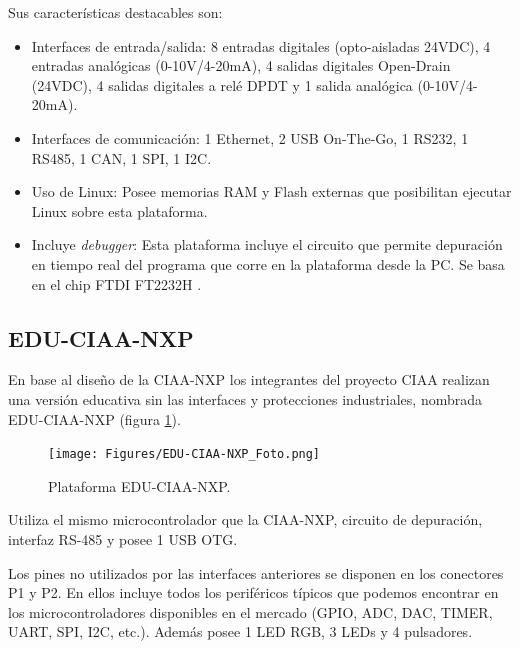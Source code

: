 Sus características destacables son:

\begin{itemize}
\item
Interfaces de entrada/salida: 8 entradas digitales (opto-aisladas 24VDC), 4 entradas analógicas (0-10V/4-20mA), 4 salidas digitales Open-Drain (24VDC), 4 salidas digitales a relé DPDT y 1 salida analógica (0-10V/4-20mA).
\item
Interfaces de comunicación: 1 Ethernet, 2 USB On-The-Go, 1 RS232, 1 RS485, 1 CAN, 1 SPI, 1 I2C.
\item
Uso de Linux: Posee memorias RAM y Flash externas que posibilitan ejecutar Linux sobre esta plataforma.
\item
Incluye \emph{debugger}: Esta plataforma incluye el circuito que permite depuración en tiempo real del programa que corre en la plataforma desde la PC. Se basa en el chip FTDI FT2232H \cite{FT2232H}.
\end{itemize}


\subsection{EDU-CIAA-NXP}

En base al diseño de la CIAA-NXP los integrantes del proyecto CIAA realizan una versión educativa sin las interfaces y protecciones industriales, nombrada EDU-CIAA-NXP (figura \ref{fig:eduCiaa}).

\begin{figure}[!htbp]
\begin{center}  %
\texttt{[image: Figures/EDU-CIAA-NXP\_Foto.png]}
\par\caption{Plataforma EDU-CIAA-NXP.}\label{fig:eduCiaa}
\end{center}
\end{figure}

Utiliza el mismo microcontrolador que la CIAA-NXP, circuito de depuración, interfaz RS-485 y posee 1 USB OTG.

Los pines no utilizados por las interfaces anteriores se disponen en los conectores P1 y P2. En ellos incluye todos los periféricos típicos que podemos encontrar en los microcontroladores disponibles en el mercado (GPIO, ADC, DAC, TIMER, UART, SPI, I2C, etc.). Además posee 1 LED RGB, 3 LEDs y 4 pulsadores.

